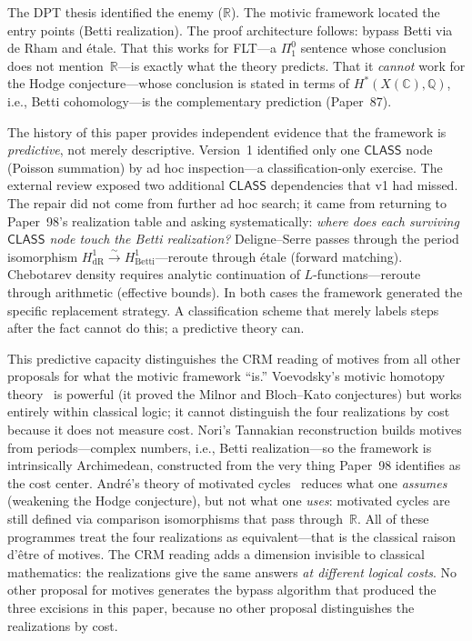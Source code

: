 \documentclass[11pt,a4paper]{article}
\theoremstyle{plain}
\theoremstyle{definition}
\newcommand{\CLASS}{\textsf{CLASS}}
\newcommand{\Q}{\mathbb{Q}}
\newcommand{\R}{\mathbb{R}}
\newcommand{\C}{\mathbb{C}}
\begin{document}
\noindent The DPT thesis identified the enemy ($\R$).
The motivic framework located the entry points (Betti realization).
The proof architecture follows: bypass Betti via de Rham and \'etale.
That this works for FLT---a $\Pi^0_1$ sentence whose conclusion does not mention~$\R$---is exactly what the theory predicts.
That it \emph{cannot} work for the Hodge conjecture---whose conclusion is stated in terms of $H^*(X(\C), \Q)$, i.e., Betti cohomology---is the complementary prediction (Paper~87).

The history of this paper provides independent evidence that the framework is \emph{predictive}, not merely descriptive.
Version~1 identified only one $\CLASS$ node (Poisson summation) by ad hoc inspection---a classification-only exercise.
The external review exposed two additional $\CLASS$ dependencies that v1 had missed.
The repair did not come from further ad hoc search; it came from returning to Paper~98's realization table and asking systematically: \emph{where does each surviving $\CLASS$ node touch the Betti realization?}
Deligne--Serre passes through the period isomorphism $H^1_{\mathrm{dR}} \xrightarrow{\sim} H^1_{\mathrm{Betti}}$---reroute through \'etale (forward matching).
Chebotarev density requires analytic continuation of $L$-functions---reroute through arithmetic (effective bounds).
In both cases the framework generated the specific replacement strategy.
A classification scheme that merely labels steps after the fact cannot do this; a predictive theory can.

This predictive capacity distinguishes the CRM reading of motives from all other proposals for what the motivic framework ``is.''
Voevodsky's motivic homotopy theory~\cite{voevodsky-icm} is powerful (it proved the Milnor and Bloch--Kato conjectures) but works entirely within classical logic; it cannot distinguish the four realizations by cost because it does not measure cost.
Nori's Tannakian reconstruction builds motives from periods---complex numbers, i.e., Betti realization---so the framework is intrinsically Archimedean, constructed from the very thing Paper~98 identifies as the cost center.
Andr\'e's theory of motivated cycles~\cite{andre96} reduces what one \emph{assumes} (weakening the Hodge conjecture), but not what one \emph{uses}: motivated cycles are still defined via comparison isomorphisms that pass through~$\R$.
All of these programmes treat the four realizations as equivalent---that is the classical raison d'\^etre of motives.
The CRM reading adds a dimension invisible to classical mathematics: the realizations give the same answers \emph{at different logical costs}.
No other proposal for motives generates the bypass algorithm that produced the three excisions in this paper, because no other proposal distinguishes the realizations by cost.
\end{document}
